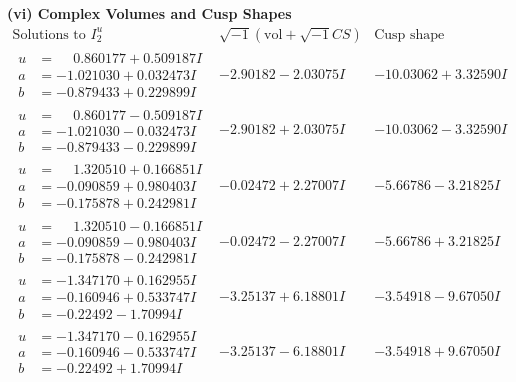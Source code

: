 \documentclass[1p]{elsarticle_modified}
\theoremstyle{definition}
\newcommand{\I}{\sqrt{-1}}
\begin{document}
\newpage\flushleft \textbf{(vi) Complex Volumes and Cusp Shapes}
$$\begin{array}{c|c|c}  
\text{Solutions to }I^u_{2}& \I (\text{vol} + \sqrt{-1}CS) & \text{Cusp shape}\\
 \hline 
\begin{aligned}
u &= \phantom{-}0.860177 + 0.509187 I \\
a &= -1.021030 + 0.032473 I \\
b &= -0.879433 + 0.229899 I\end{aligned}
 & -2.90182 - 2.03075 I & -10.03062 + 3.32590 I \\ \hline\begin{aligned}
u &= \phantom{-}0.860177 - 0.509187 I \\
a &= -1.021030 - 0.032473 I \\
b &= -0.879433 - 0.229899 I\end{aligned}
 & -2.90182 + 2.03075 I & -10.03062 - 3.32590 I \\ \hline\begin{aligned}
u &= \phantom{-}1.320510 + 0.166851 I \\
a &= -0.090859 + 0.980403 I \\
b &= -0.175878 + 0.242981 I\end{aligned}
 & -0.02472 + 2.27007 I & -5.66786 - 3.21825 I \\ \hline\begin{aligned}
u &= \phantom{-}1.320510 - 0.166851 I \\
a &= -0.090859 - 0.980403 I \\
b &= -0.175878 - 0.242981 I\end{aligned}
 & -0.02472 - 2.27007 I & -5.66786 + 3.21825 I \\ \hline\begin{aligned}
u &= -1.347170 + 0.162955 I \\
a &= -0.160946 + 0.533747 I \\
b &= -0.22492 - 1.70994 I\end{aligned}
 & -3.25137 + 6.18801 I & -3.54918 - 9.67050 I \\ \hline\begin{aligned}
u &= -1.347170 - 0.162955 I \\
a &= -0.160946 - 0.533747 I \\
b &= -0.22492 + 1.70994 I\end{aligned}
 & -3.25137 - 6.18801 I & -3.54918 + 9.67050 I \\ \hline\begin{aligned}

\end{aligned}
\end{array}$$
\end{document}
